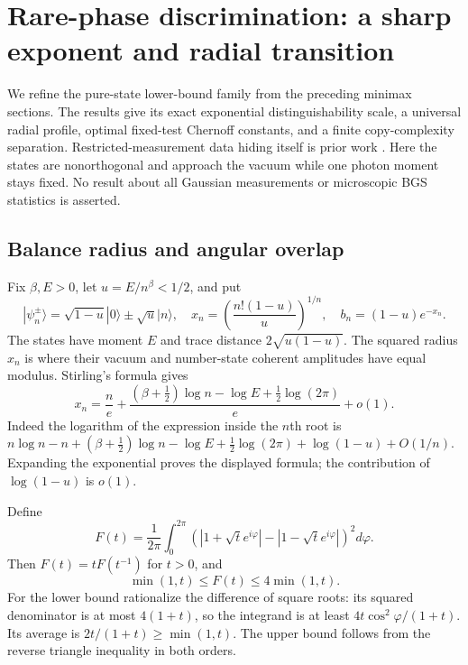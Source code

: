 \documentclass[11pt,a4paper]{article}
\numberwithin{equation}{section}
\begin{document}
\section{Rare-phase discrimination: a sharp exponent and radial transition}
\label{sec:rare-phase}
We refine the pure-state lower-bound family from the preceding minimax
sections. The results give its exact exponential distinguishability scale,
a universal radial profile, optimal fixed-test Chernoff constants, and a
finite copy-complexity separation. Restricted-measurement data hiding itself
is prior work \cite{Lami2021,SW2021}. Here the states are nonorthogonal and
approach the vacuum while one photon moment stays fixed. No result about
all Gaussian measurements or microscopic BGS statistics is asserted.

\subsection{Balance radius and angular overlap}
Fix $\beta,E>0$, let $u=E/n^\beta<1/2$, and put
\[
 |\psi_n^\pm\rangle=\sqrt{1-u}|0\rangle\pm\sqrt u|n\rangle,
 \quad x_n=\left(\frac{n!(1-u)}u\right)^{1/n},
 \quad b_n=(1-u)e^{-x_n}.
 \tag{C.1}\label{eq:rare-balance}
\]
The states have moment $E$ and trace distance $2\sqrt{u(1-u)}$.
The squared radius $x_n$ is where their vacuum and number-state coherent
amplitudes have equal modulus. Stirling's formula gives
\[
 x_n=\frac ne+
 \frac{(\beta+\tfrac12)\log n-\log E+\tfrac12\log(2\pi)}e+o(1).
 \tag{C.2}\label{eq:rare-radius}
\]
Indeed the logarithm of the expression inside the $n$th root is
$n\log n-n+(\beta+\tfrac12)\log n-\log E+
\tfrac12\log(2\pi)+\log(1-u)+O(1/n)$. Expanding the exponential proves
the displayed formula; the contribution of $\log(1-u)$ is $o(1)$.

Define
\[
 F(t)=\frac1{2\pi}\int_0^{2\pi}
 \left(\left|1+\sqrt t e^{i\varphi}\right|
           -\left|1-\sqrt t e^{i\varphi}\right|\right)^2d\varphi.
 \tag{C.3}\label{eq:rare-F}
\]
Then $F(t)=tF(t^{-1})$ for $t>0$, and
\[
 \min(1,t)\le F(t)\le4\min(1,t).
 \tag{C.4}\label{eq:rare-F-bounds}
\]
For the lower bound rationalize the difference of square roots: its squared
denominator is at most $4(1+t)$, so the integrand is at least
$4t\cos^2\varphi/(1+t)$. Its average is $2t/(1+t)\ge\min(1,t)$.
The upper bound follows from the reverse triangle inequality in both orders.
\end{document}
